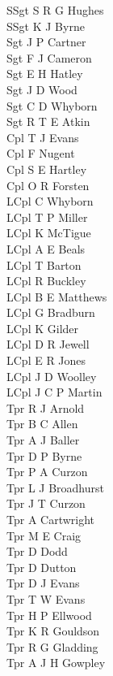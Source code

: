 \begin{multicols}{2}
  \noindent
  SSgt S R G Hughes \\
  SSgt K J Byrne \\
  Sgt J P Cartner \\
  Sgt F J Cameron \\
  Sgt E H Hatley \\
  Sgt J D Wood \\
  Sgt C D Whyborn \\
  Sgt R T E Atkin \\
  Cpl T J Evans \\
  Cpl F Nugent \\
  Cpl S E Hartley \\
  Cpl O R Forsten \\
  LCpl C Whyborn \\
  LCpl T P Miller \\
  LCpl K McTigue \\
  LCpl A E Beals \\
  LCpl T Barton \\
  LCpl R Buckley \\
  LCpl B E Matthews \\
  LCpl G Bradburn \\
  LCpl K Gilder \\
  LCpl D R Jewell \\
  LCpl E R Jones \\
  LCpl J D Woolley \\
  LCpl J C P Martin \\
  Tpr R J Arnold \\
  Tpr B C Allen \\
  Tpr A J Baller \\
  Tpr D P Byrne \\
  Tpr P A Curzon \\
  Tpr L J Broadhurst \\
  Tpr J T Curzon \\
  Tpr A Cartwright \\
  Tpr M E Craig \\
  Tpr D Dodd \\
  Tpr D Dutton \\
  Tpr D J Evans \\
  Tpr T W Evans \\
  Tpr H P Ellwood \\
  Tpr K R Gouldson \\
  Tpr R G Gladding \\
  Tpr A J H Gowpley \\

\end{multicols}
